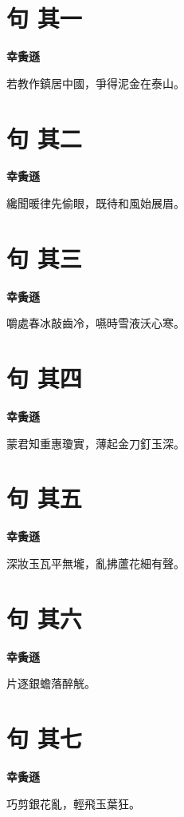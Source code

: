 \documentclass[12pt,a4paper]{ctexbook}
\begin{document}
\section{句  其一}
\textbf{幸夤遜}\par\vspace{0.5em}
若教作鎮居中國，爭得泥金在泰山。\par

\section{句  其二}
\textbf{幸夤遜}\par\vspace{0.5em}
纔聞暖律先偷眼，既待和風始展眉。\par

\section{句  其三}
\textbf{幸夤遜}\par\vspace{0.5em}
嚼處春冰敲齒冷，嚥時雪液沃心寒。\par

\section{句  其四}
\textbf{幸夤遜}\par\vspace{0.5em}
蒙君知重惠瓊實，薄起金刀釘玉深。\par

\section{句  其五}
\textbf{幸夤遜}\par\vspace{0.5em}
深妝玉瓦平無壠，亂拂蘆花細有聲。\par

\section{句  其六}
\textbf{幸夤遜}\par\vspace{0.5em}
片逐銀蟾落醉觥。\par

\section{句  其七}
\textbf{幸夤遜}\par\vspace{0.5em}
巧剪銀花亂，輕飛玉葉狂。\par
\end{document}

